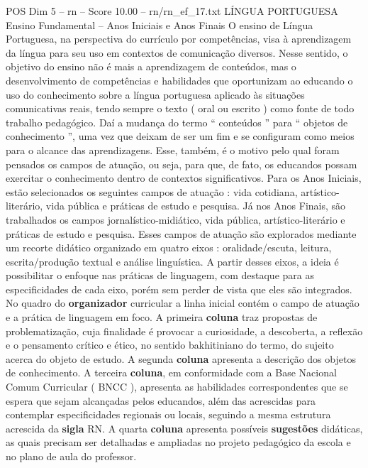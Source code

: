 \begin{textsample}{POS Dim 5 – rn – Score 10.00 – rn/rn\_ef\_17.txt}  \label{ex:f5_pos_141}
LÍNGUA PORTUGUESA Ensino Fundamental – Anos Iniciais e Anos Finais O ensino de Língua Portuguesa, na perspectiva do currículo por competências, visa à aprendizagem da língua para seu uso em contextos de comunicação diversos.
Nesse sentido, o objetivo do ensino não é mais a aprendizagem de conteúdos, mas o desenvolvimento de competências e habilidades que oportunizam ao educando o uso do conhecimento sobre a língua portuguesa aplicado às situações comunicativas reais, tendo sempre o texto ( oral ou escrito ) como fonte de todo trabalho pedagógico.
Daí a mudança do termo “ conteúdos ” para “ objetos de conhecimento ”, uma vez que deixam de ser um fim e se configuram como meios para o alcance das aprendizagens.
Esse, também, é o motivo pelo qual foram pensados os campos de atuação, ou seja, para que, de fato, os educandos possam exercitar o conhecimento dentro de contextos significativos.
Para os Anos Iniciais, estão selecionados os seguintes campos de atuação : vida cotidiana, artístico-literário, vida pública e práticas de estudo e pesquisa.
Já nos Anos Finais, são trabalhados os campos jornalístico-midiático, vida pública, artístico-literário e práticas de estudo e pesquisa.
Esses campos de atuação são explorados mediante um recorte didático organizado em quatro eixos : oralidade/escuta, leitura, escrita/produção textual e análise linguística.
A partir desses eixos, a ideia é possibilitar o enfoque nas práticas de linguagem, com destaque para as especificidades de cada eixo, porém sem perder de vista que eles são integrados.
No quadro do \textbf{organizador} curricular a linha inicial contém o campo de atuação e a prática de linguagem em foco.
A primeira \textbf{coluna} traz propostas de problematização, cuja finalidade é provocar a curiosidade, a descoberta, a reflexão e o pensamento crítico e ético, no sentido bakhitiniano do termo, do sujeito acerca do objeto de estudo.
A segunda \textbf{coluna} apresenta a descrição dos objetos de conhecimento.
A terceira \textbf{coluna}, em conformidade com a Base Nacional Comum Curricular ( BNCC ), apresenta as habilidades correspondentes que se espera que sejam alcançadas pelos educandos, além das acrescidas para contemplar especificidades regionais ou locais, seguindo a mesma estrutura acrescida da \textbf{sigla} RN.
A quarta \textbf{coluna} apresenta possíveis \textbf{sugestões} didáticas, as quais precisam ser detalhadas e ampliadas no projeto pedagógico da escola e no plano de aula do professor.

\end{textsample}
